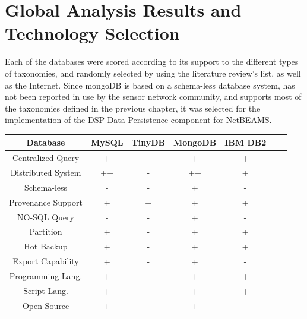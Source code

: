 \section{Global Analysis Results and Technology Selection}

Each of the databases were scored according to its support to the different
types of taxonomies, and randomly selected by using the literature review's
list, as well as the Internet. Since mongoDB is based on a schema-less database
system, has not been reported in use by the sensor network community, and
supports most of the taxonomies defined in the previous chapter, it was
selected for the implementation of the DSP Data Persistence component for
NetBEAMS.

\begin{table}
    \label{tab:ysi-data-distribution}
    \begin{center}
        \begin{tabular}{|c|c|c|c|c|c|c|}\hline 
        \textbf{Database} & \textbf{MySQL} & \textbf{TinyDB} & \textbf{MongoDB} & \textbf{IBM DB2}\\\hline
        Centralized Query & + & + & + & + \\\hline 
        Distributed System & ++ & - & ++ & +\\\hline 
        Schema-less & - & - & + & -\\\hline 
        Provenance Support & + & + & + & +\\\hline 
        NO-SQL Query & - & - & + & -\\\hline 
        Partition & + & - & + & +\\\hline 
        Hot Backup & + & - & + & +\\\hline 
        Export Capability & + & - & + & -\\\hline 
        Programming Lang. & + & + & + & +\\\hline
        Script Lang. & + & - & + & +\\\hline
        Open-Source & + & + & + & -\\\hline
        \end{tabular}
    \end{center}
\end{table}